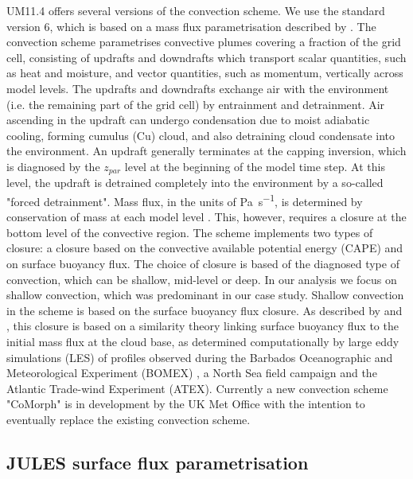 UM11.4 offers several versions of the convection scheme. We use the standard
version 6, which is based on a mass flux parametrisation described by \cite{gregory1990}.
The convection scheme parametrises convective plumes covering a fraction of the grid cell,
consisting of updrafts and downdrafts which transport scalar quantities,
such as heat and moisture, and vector quantities, such as momentum, vertically
across model levels. The updrafts and downdrafts exchange air with the
environment (i.e. the remaining part of the grid cell) by entrainment and
detrainment. Air ascending in the updraft can undergo condensation due to
moist adiabatic cooling, forming cumulus (Cu) cloud, and also detraining cloud
condensate into the environment. An updraft generally terminates at the capping
inversion, which is diagnosed by the $z_{par}$ level at the beginning of the
model time step. At this level, the updraft
is detrained completely into the environment by a so-called "forced detrainment".
Mass flux, in the units of \unit{Pa.s^{-1}}, is determined by
conservation of mass at each model level \citep{gregory1990}. This, however,
requires a closure at the bottom level of the convective region. The scheme implements
two types of closure: a closure based on the
convective available potential energy (CAPE) and on surface buoyancy flux.
The choice of closure is based of the diagnosed type of convection, which can be
shallow, mid-level or deep. In our analysis we focus on shallow convection,
which was predominant in our case study. Shallow convection in the scheme is based on the
surface buoyancy flux closure. As described by \cite{grant1999} and \cite{grant2001},
this closure is based on a similarity
theory linking surface buoyancy flux to the initial mass flux at the cloud
base, as determined computationally by large eddy simulations (LES) of profiles
observed during the Barbados Oceanographic and Meteorological Experiment (BOMEX)
\citep{davidson1968}, a North Sea field campaign \citep{smith1995} and the Atlantic Trade-wind
Experiment (ATEX). Currently a new convection scheme "CoMorph" is in development by the UK Met Office
with the intention to eventually replace the existing convection scheme.

\subsection{JULES surface flux parametrisation}
\label{sec:4:jules}


